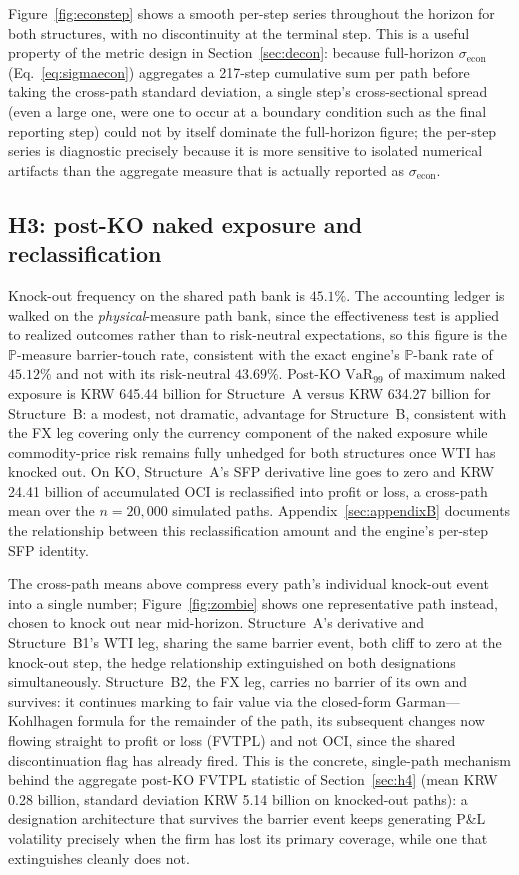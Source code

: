 \documentclass[11pt,a4paper]{article}
\begin{document}
Figure~\ref{fig:econstep} shows a smooth per-step series throughout the horizon for both structures, with no discontinuity at the terminal step. This is a useful property of the metric design in Section~\ref{sec:decon}: because full-horizon $\sigma_{\mathrm{econ}}$ (Eq.~\ref{eq:sigmaecon}) aggregates a 217-step cumulative sum per path before taking the cross-path standard deviation, a single step's cross-sectional spread (even a large one, were one to occur at a boundary condition such as the final reporting step) could not by itself dominate the full-horizon figure; the per-step series is diagnostic precisely because it is more sensitive to isolated numerical artifacts than the aggregate measure that is actually reported as $\sigma_{\mathrm{econ}}$.

\subsection{H3: post-KO naked exposure and reclassification}
\label{sec:h3}

Knock-out frequency on the shared path bank is $45.1\%$. The accounting ledger is walked on the \emph{physical}-measure path bank, since the effectiveness test is applied to realized outcomes rather than to risk-neutral expectations, so this figure is the $\mathbb P$-measure barrier-touch rate, consistent with the exact engine's $\mathbb P$-bank rate of $45.12\%$ and not with its risk-neutral $43.69\%$. Post-KO $\mathrm{VaR}_{99}$ of maximum naked exposure is KRW 645.44 billion for Structure~A versus KRW 634.27 billion for Structure~B: a modest, not dramatic, advantage for Structure~B, consistent with the FX leg covering only the currency component of the naked exposure while commodity-price risk remains fully unhedged for both structures once WTI has knocked out. On KO, Structure~A's SFP derivative line goes to zero and KRW 24.41 billion of accumulated OCI is reclassified into profit or loss, a cross-path mean over the $n=20{,}000$ simulated paths. Appendix~\ref{sec:appendixB} documents the relationship between this reclassification amount and the engine's per-step SFP identity.

The cross-path means above compress every path's individual knock-out event into a single number; Figure~\ref{fig:zombie} shows one representative path instead, chosen to knock out near mid-horizon. Structure~A's derivative and Structure~B1's WTI leg, sharing the same barrier event, both cliff to zero at the knock-out step, the hedge relationship extinguished on both designations simultaneously. Structure~B2, the FX leg, carries no barrier of its own and survives: it continues marking to fair value via the closed-form Garman---Kohlhagen formula for the remainder of the path, its subsequent changes now flowing straight to profit or loss (FVTPL) and not OCI, since the shared discontinuation flag has already fired. This is the concrete, single-path mechanism behind the aggregate post-KO FVTPL statistic of Section~\ref{sec:h4} (mean KRW 0.28 billion, standard deviation KRW 5.14 billion on knocked-out paths): a designation architecture that survives the barrier event keeps generating P\&L volatility precisely when the firm has lost its primary coverage, while one that extinguishes cleanly does not.
\end{document}
